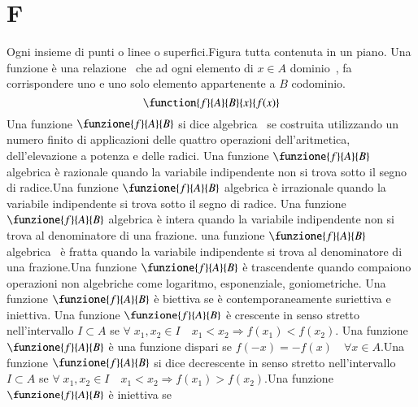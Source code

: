 \chapter{F}
\vspace{5mm}
Ogni insieme di punti o linee o  superfici.Figura tutta contenuta in un piano.
Una funzione è una relazione\pointsto~ che ad ogni elemento di $x\in A$ dominio\pointsto~, fa corrispondere uno e uno solo elemento appartenente a $B$ codominio.
\begin{equation*}
\function{f}{A}{B}{x}{f(x)}
\end{equation*}
Una funzione $\funzione{f}{A}{B}$ si dice algebrica\pointsto~ se costruita utilizzando un numero finito di applicazioni delle quattro operazioni dell'aritmetica, dell'elevazione a potenza e delle radici.
Una funzione $\funzione{f}{A}{B}$ algebrica è razionale quando la variabile indipendente non si trova sotto il segno di radice.Una funzione $\funzione{f}{A}{B}$ algebrica è irrazionale quando la variabile indipendente si trova sotto il segno di radice.
Una funzione $\funzione{f}{A}{B}$ algebrica è intera quando la variabile indipendente non si trova al denominatore di una frazione. una funzione $\funzione{f}{A}{B}$ algebrica\pointsto~ è fratta quando la variabile indipendente si trova al denominatore di una frazione.Una funzione $\funzione{f}{A}{B}$ è trascendente quando compaiono operazioni non algebriche come logaritmo, esponenziale, goniometriche.
Una funzione $\funzione{f}{A}{B}$ è biettiva se è contemporaneamente suriettiva e iniettiva.
Una funzione $\funzione{f}{A}{B}$ è crescente in senso stretto nell'intervallo $I\subset A$ se
$\forall\; x_1,x_2\in I\quad x_1< x_2\Longrightarrow f(x_1)<f(x_2).$
Una funzione $\funzione{f}{A}{B}$ è una funzione dispari se $f(-x)=-f(x)\quad\forall x\in A$.Una funzione $\funzione{f}{A}{B}$ si dice decrescente in senso stretto nell'intervallo $I\subset A$ se
$\forall\; x_1,x_2\in I\quad x_1< x_2\Longrightarrow f(x_1)>f(x_2)$.Una funzione $\funzione{f}{A}{B}$ è iniettiva se
